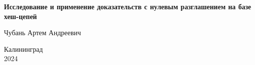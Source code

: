 \begin{titlepage}
	\centering
	\vspace*{2cm}

	{\Huge \textbf{Исследование и применение доказательств с нулевым разглашением на базе хеш-цепей}}

	\vspace{1.5cm}

	{\Large Чубань Артем Андреевич}

	\vfill



	{\large Калининград} \\
	{\large 2024}
\end{titlepage}
